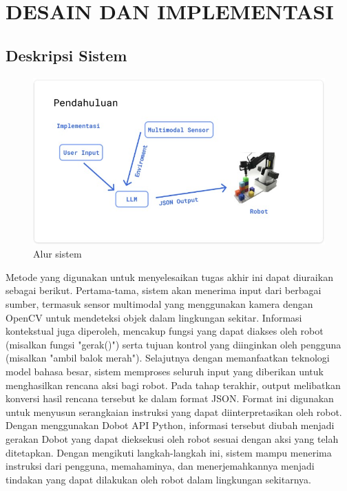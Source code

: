 \chapter{DESAIN DAN IMPLEMENTASI}
\label{chap:desainimplementasi}


\section{Deskripsi Sistem}

\begin{figure} [H] \centering
  \includegraphics[scale=0.8]{gambar/pend.jpg}
  \caption{Alur sistem}
\end{figure}

Metode yang digunakan untuk menyelesaikan tugas akhir ini dapat diuraikan sebagai berikut. Pertama-tama, sistem akan menerima input dari berbagai sumber, termasuk sensor multimodal yang menggunakan kamera dengan OpenCV untuk mendeteksi objek dalam lingkungan sekitar. Informasi kontekstual juga diperoleh, mencakup fungsi yang dapat diakses oleh robot (misalkan fungsi "gerak()") serta tujuan kontrol yang diinginkan oleh pengguna (misalkan "ambil balok merah"). Selajutnya dengan memanfaatkan teknologi model bahasa besar, sistem memproses seluruh input yang diberikan untuk menghasilkan rencana aksi bagi robot. Pada tahap terakhir, output melibatkan konversi hasil rencana tersebut ke dalam format JSON. Format ini digunakan untuk menyusun serangkaian instruksi yang dapat diinterpretasikan oleh robot. Dengan menggunakan Dobot API Python, informasi tersebut diubah menjadi gerakan Dobot yang dapat dieksekusi oleh robot sesuai dengan aksi yang telah ditetapkan. Dengan mengikuti langkah-langkah ini, sistem mampu menerima instruksi dari pengguna, memahaminya, dan menerjemahkannya menjadi tindakan yang dapat dilakukan oleh robot dalam lingkungan sekitarnya.

